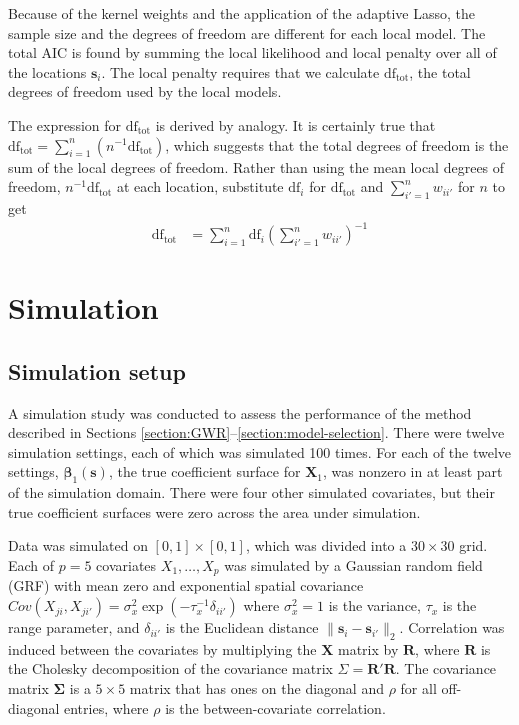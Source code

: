 \documentclass[authoryear, review, 11pt]{elsarticle}
\begin{document}
	Because of the kernel weights and the application of the adaptive Lasso, the sample size and the degrees of freedom are different for each local model. The total AIC is found by summing the local likelihood and local penalty over all of the locations $\bm{s}_i$. The local penalty requires that we calculate $\text{df}_{\text{tot}}$, the total degrees of freedom used by the local models.
	
	The expression for $\text{df}_{\text{tot}}$ is derived by analogy. It is certainly true that $\text{df}_{\text{tot}} = \sum\limits_{i=1}^n \left( n^{-1} \text{df}_{\text{tot}} \right)$, which suggests that the total degrees of freedom is the sum of the local degrees of freedom. Rather than using the mean local degrees of freedom, $n^{-1} \text{df}_{\text{tot}}$ at each location, substitute $\text{df}_i$ for $\text{df}_{\text{tot}}$ and $\sum\limits_{i'=1}^n w_{ii'}$ for $n$ to get 
	\begin{align}
		\text{df}_{\text{tot}} &= \sum\limits_{i=1}^n \text{df}_i  \left( \sum\limits_{i'=1}^n w_{ii'} \right)^{-1}
	\end{align}

\section{Simulation \label{sec:simulation}}
	\subsection{Simulation setup}
	A simulation study was conducted to assess the performance of the method described in Sections \ref{section:GWR}--\ref{section:model-selection}. There were twelve simulation settings, each of which was simulated 100 times. For each of the twelve settings, $\bm{\beta}_1(\bm{s})$, the true coefficient surface for $\bm{X}_1$, was nonzero in at least part of the simulation domain. There were four other simulated covariates, but their true coefficient surfaces were zero across the area under simulation.
	
	Data was simulated on $[0,1] \times [0,1]$, which was divided into a $30 \times 30$ grid. Each of $p=5$ covariates $X_1, \dots, X_p$ was simulated by a Gaussian random field (GRF) with mean zero and exponential spatial covariance $Cov \left(X_{ji}, X_{ji'} \right) = \sigma_x^2 \exp{\left( -\tau_x^{-1} \delta_{ii'} \right)}$ where $\sigma_x^2=1$ is the variance, $\tau_x$ is the range parameter, and $\delta_{ii'}$ is the Euclidean distance $\|\bm{s}_i - \bm{s}_{i'}\|_2$. Correlation was induced between the covariates by multiplying the $\bm{X}$ matrix by $\bm{R}$, where $\bm{R}$ is the Cholesky decomposition of the covariance matrix $\Sigma = \bm{R}'\bm{R}$. The covariance matrix $\bm{\Sigma}$ is a $5 \times 5$ matrix that has ones on the diagonal and $\rho$ for all off-diagonal entries, where $\rho$ is the between-covariate correlation.
		
\end{document}
